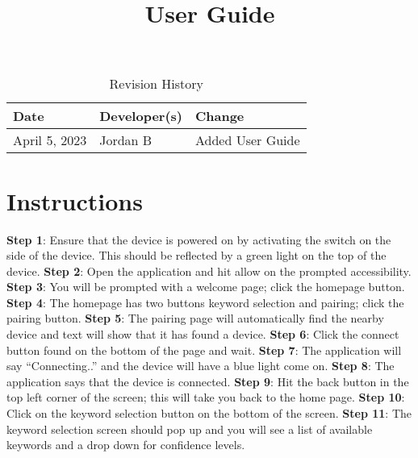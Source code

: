 \documentclass{article}
\title{User Guide\\\progname}
\author{\authname}
\date{}
\begin{document}
\maketitle
\newpage


\begin{table}[hp]
\caption{Revision History} \label{TblRevisionHistory}
\begin{tabularx}{\textwidth}{llX}
\toprule
\textbf{Date} & \textbf{Developer(s)} & \textbf{Change}\\
\midrule
April 5, 2023 & Jordan B & Added User Guide\\
\bottomrule
\end{tabularx}
\end{table}

\newpage

\section{Instructions}
\textbf{Step 1}: Ensure that the device is powered on by activating the switch on the side of the device. This should be reflected by a green light on the top of the device.
\newline
\textbf{Step 2}: Open the application and hit allow on the prompted accessibility.
\newline
\textbf{Step 3}: You will be prompted with a welcome page; click the homepage button.
\newline
\textbf{Step 4}: The homepage has two buttons keyword selection and pairing; click the pairing button.
\newline
\textbf{Step 5}: The pairing page will automatically find the nearby device and text will show that it has found a device.
\newline
\textbf{Step 6}: Click the connect button found on the bottom of the page and wait.
\newline
\textbf{Step 7}: The application will say “Connecting..” and the device will have a blue light come on.
\newline
\textbf{Step 8}: The application says that the device is connected.
\newline
\textbf{Step 9}: Hit the back button in the top left corner of the screen; this will take you back to the home page.
\newline
\textbf{Step 10}: Click on the keyword selection button on the bottom of the screen.
\newline
\textbf{Step 11}: The keyword selection screen should pop up and you will see a list of available keywords and a drop down for confidence levels.
\end{document}
